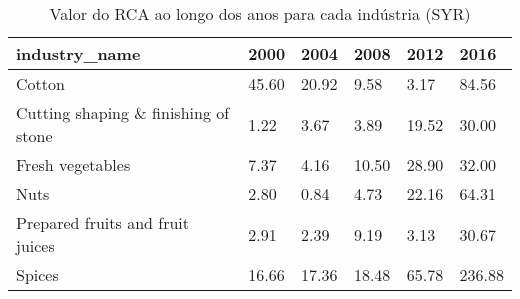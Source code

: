 \begin{table}
\centering
\caption{Valor do RCA ao longo dos anos para cada indústria (SYR)}
\begin{tabular}{p{6cm}p{1.5cm}p{1.5cm}p{1.5cm}p{1.5cm}p{1.5cm}}
\toprule
                       industry\_name &  2000 &  2004 &  2008 &  2012 &   2016 \\
\midrule
                              Cotton & 45.60 & 20.92 &  9.58 &  3.17 &  84.56 \\
Cutting shaping \& finishing of stone &  1.22 &  3.67 &  3.89 & 19.52 &  30.00 \\
                    Fresh vegetables &  7.37 &  4.16 & 10.50 & 28.90 &  32.00 \\
                                Nuts &  2.80 &  0.84 &  4.73 & 22.16 &  64.31 \\
    Prepared fruits and fruit juices &  2.91 &  2.39 &  9.19 &  3.13 &  30.67 \\
                              Spices & 16.66 & 17.36 & 18.48 & 65.78 & 236.88 \\
\bottomrule
\end{tabular}
\end{table}
